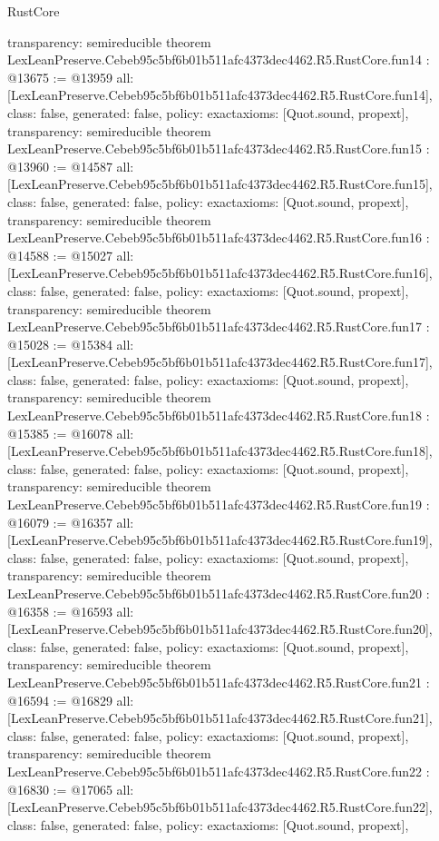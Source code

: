 \begin{lexlean}{RustCore}
\begin{coremodule}
{  transparency: semireducible
}
theorem LexLeanPreserve.Cebeb95c5bf6b01b511afc4373dec4462.R5.RustCore.fun14 : @13675 := @13959 {
  all: [LexLeanPreserve.Cebeb95c5bf6b01b511afc4373dec4462.R5.RustCore.fun14],
  class: false,
  generated: false,
  policy: exact{axioms: [Quot.sound, propext]},
  transparency: semireducible
}
theorem LexLeanPreserve.Cebeb95c5bf6b01b511afc4373dec4462.R5.RustCore.fun15 : @13960 := @14587 {
  all: [LexLeanPreserve.Cebeb95c5bf6b01b511afc4373dec4462.R5.RustCore.fun15],
  class: false,
  generated: false,
  policy: exact{axioms: [Quot.sound, propext]},
  transparency: semireducible
}
theorem LexLeanPreserve.Cebeb95c5bf6b01b511afc4373dec4462.R5.RustCore.fun16 : @14588 := @15027 {
  all: [LexLeanPreserve.Cebeb95c5bf6b01b511afc4373dec4462.R5.RustCore.fun16],
  class: false,
  generated: false,
  policy: exact{axioms: [Quot.sound, propext]},
  transparency: semireducible
}
theorem LexLeanPreserve.Cebeb95c5bf6b01b511afc4373dec4462.R5.RustCore.fun17 : @15028 := @15384 {
  all: [LexLeanPreserve.Cebeb95c5bf6b01b511afc4373dec4462.R5.RustCore.fun17],
  class: false,
  generated: false,
  policy: exact{axioms: [Quot.sound, propext]},
  transparency: semireducible
}
theorem LexLeanPreserve.Cebeb95c5bf6b01b511afc4373dec4462.R5.RustCore.fun18 : @15385 := @16078 {
  all: [LexLeanPreserve.Cebeb95c5bf6b01b511afc4373dec4462.R5.RustCore.fun18],
  class: false,
  generated: false,
  policy: exact{axioms: [Quot.sound, propext]},
  transparency: semireducible
}
theorem LexLeanPreserve.Cebeb95c5bf6b01b511afc4373dec4462.R5.RustCore.fun19 : @16079 := @16357 {
  all: [LexLeanPreserve.Cebeb95c5bf6b01b511afc4373dec4462.R5.RustCore.fun19],
  class: false,
  generated: false,
  policy: exact{axioms: [Quot.sound, propext]},
  transparency: semireducible
}
theorem LexLeanPreserve.Cebeb95c5bf6b01b511afc4373dec4462.R5.RustCore.fun20 : @16358 := @16593 {
  all: [LexLeanPreserve.Cebeb95c5bf6b01b511afc4373dec4462.R5.RustCore.fun20],
  class: false,
  generated: false,
  policy: exact{axioms: [Quot.sound, propext]},
  transparency: semireducible
}
theorem LexLeanPreserve.Cebeb95c5bf6b01b511afc4373dec4462.R5.RustCore.fun21 : @16594 := @16829 {
  all: [LexLeanPreserve.Cebeb95c5bf6b01b511afc4373dec4462.R5.RustCore.fun21],
  class: false,
  generated: false,
  policy: exact{axioms: [Quot.sound, propext]},
  transparency: semireducible
}
theorem LexLeanPreserve.Cebeb95c5bf6b01b511afc4373dec4462.R5.RustCore.fun22 : @16830 := @17065 {
  all: [LexLeanPreserve.Cebeb95c5bf6b01b511afc4373dec4462.R5.RustCore.fun22],
  class: false,
  generated: false,
  policy: exact{axioms: [Quot.sound, propext]},
}
\end{coremodule}
\end{lexlean}
